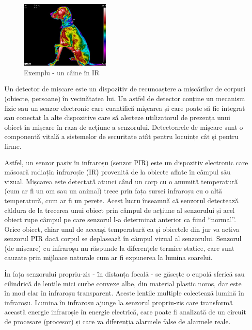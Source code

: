 \begin{figure}[!h]
    \centering
    \includegraphics[width=0.4\textwidth]{dog.jpg}
    \caption{Exemplu - un câine în IR}
    \label{fig:mesh1}
\end{figure}

\quad Un detector de mișcare este un dispozitiv de recunoaștere a mișcărilor de corpuri (obiecte, persoane) în vecinătatea lui. Un astfel de detector conține un mecanism fizic sau un senzor electronic care cuantifică mișcarea și care poate să fie integrat sau conectat la alte dispozitive care să alerteze utilizatorul de prezența unui obiect în mișcare în raza de acțiune a senzorului. Detectoarele de mișcare sunt o componentă vitală a sistemelor de securitate atât pentru locuințe cât și pentru firme.

\quad Astfel, un senzor pasiv în infraroșu (senzor PIR) este un dispozitiv electronic care măsoară radiația infraroșie (IR) provenită de la obiecte aflate în câmpul său vizual. Mișcarea este detectată atunci când un corp cu o anumită temperatură (cum ar fi un om sau un animal) trece prin fața sursei infraroșu cu o altă temperatură, cum ar fi un perete. Acest lucru înseamnă că senzorul detectează căldura de la trecerea unui obiect prin câmpul de acțiune al senzorului și acel obiect rupe câmpul pe care senzorul l-a determinat anterior ca fiind “normal”. Orice obiect, chiar unul de aceeași temperatură ca și obiectele din jur va activa senzorul PIR dacă corpul se deplasează în câmpul vizual al senzorului. Senzorul (de mișcare) cu infraroșu nu răspunde la diferențele termice statice, care sunt cauzate prin mijloace naturale cum ar fi expunerea la lumina soarelui.

\quad În fața senzorului propriu-zis - în distanța focală - se găsește o cupolă sferică sau cilindrică de lentile mici curbe convexe albe, din material plastic noros, dar este în mod clar în infraroșu transparent. Aceste lentile multiple colectează lumină în infraroșu. Lumina în infraroșu ajunge la senzorul propriu-zis care transformă această energie infraroșie în energie electrică, care poate fi analizată de un circuit de procesare (procesor) și care va diferenția alarmele false de alarmele reale.

